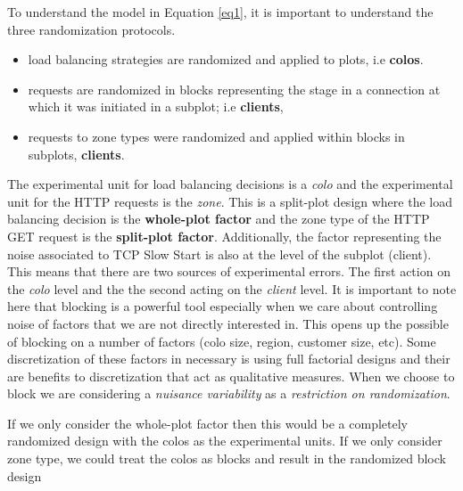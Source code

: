 \documentclass{article}
\begin{document}
To understand the model in Equation \ref{eq1}, it is important to understand the three randomization protocols. 
\begin{itemize}
    \item load balancing strategies are randomized and applied to plots, i.e \textbf{colos}.
     \item requests are randomized in blocks representing the stage in a connection at which it was initiated in a subplot; i.e \textbf{clients},
    \item requests to zone types were randomized and applied within blocks in subplots, \textbf{clients}.  
\end{itemize}

The experimental unit for load balancing decisions is a \textit{colo} and the experimental unit for the HTTP requests is the \textit{zone}. This is a split-plot design where the load balancing decision is the \textbf{whole-plot factor} and the zone type of the HTTP GET request is the \textbf{split-plot factor}. Additionally, the factor representing the noise associated to TCP Slow Start is also at the level of the subplot (client). This means that there are two sources of experimental errors. The first action on the \textit{colo} level and the the second acting on the \textit{client} level. 
It is important to note here that blocking is a powerful tool especially when we care about controlling noise of factors that we are not directly interested in. This opens up the possible of blocking on a number of factors (colo size, region, customer size, etc). Some discretization of these factors in necessary is using full factorial designs and their are benefits to discretization that act as qualitative measures. When we choose to block we are considering a \textit{nuisance variability} as a \textit{restriction on randomization}.

If we only consider the whole-plot factor then this would be a completely randomized design with the colos as the experimental units. If we only consider zone type, we could treat the colos as blocks and result in the randomized block design
\end{document}

